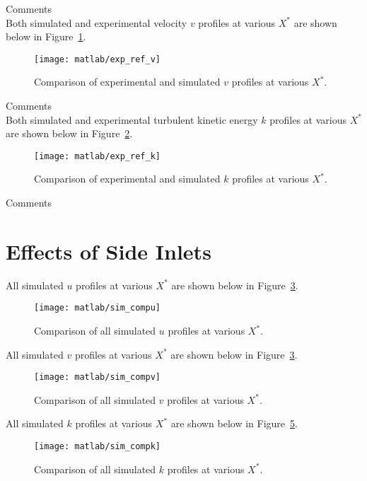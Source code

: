 Comments\\

Both simulated and experimental velocity $v$ profiles at various $X^*$ are shown below in Figure~\ref{fig:exp_ref_v}.
\begin{figure}[H]
	\centering
	\texttt{[image: matlab/exp\_ref\_v]}
	\caption{Comparison of experimental and simulated $v$ profiles at various $X^*$.}
	\label{fig:exp_ref_v}
\end{figure}

Comments\\

Both simulated and experimental turbulent kinetic energy $k$ profiles at various $X^*$ are shown below in Figure~\ref{fig:exp_ref_k}.
\begin{figure}[H]
	\centering
	\texttt{[image: matlab/exp\_ref\_k]}
	\caption{Comparison of experimental and simulated $k$ profiles at various $X^*$.}
	\label{fig:exp_ref_k}
\end{figure}

Comments\\

\section{Effects of Side Inlets}
\label{sec:effects_side}

All simulated $u$ profiles at various $X^*$ are shown below in Figure~\ref{fig:sim_compu}.
\begin{figure}[H]
	\centering
	\texttt{[image: matlab/sim\_compu]}
	\caption{Comparison of all simulated $u$ profiles at various $X^*$.}
	\label{fig:sim_compu}
\end{figure}


All simulated $v$ profiles at various $X^*$ are shown below in Figure~\ref{fig:sim_compu}.
\begin{figure}[H]
	\centering
	\texttt{[image: matlab/sim\_compv]}
	\caption{Comparison of all simulated $v$ profiles at various $X^*$.}
	\label{fig:sim_compv}
\end{figure}


All simulated $k$ profiles at various $X^*$ are shown below in Figure~\ref{fig:sim_compk}.
\begin{figure}[H]
	\centering
	\texttt{[image: matlab/sim\_compk]}
	\caption{Comparison of all simulated $k$ profiles at various $X^*$.}
	\label{fig:sim_compk}
\end{figure}

